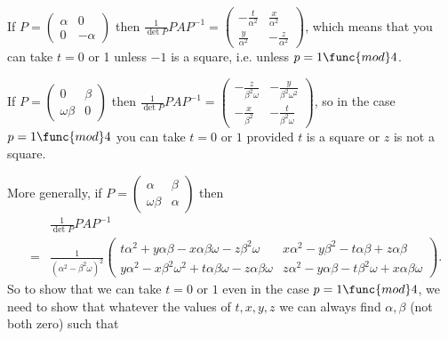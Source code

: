 \documentclass[12pt]{article}
\begin{document}
If $P=\left( 
\begin{array}{ll}
\alpha & 0 \\ 
0 & -\alpha%
\end{array}%
\right) $ then $\frac{1}{\det P}PAP^{-1}=\allowbreak \left( 
\begin{array}{cc}
-\frac{t}{\alpha ^{2}} & \frac{x}{\alpha ^{2}} \\ 
\frac{y}{\alpha ^{2}} & -\frac{z}{\alpha ^{2}}%
\end{array}%
\right) $, which means that you can take $t=0$ or 1 unless $-1$ is a square,
i.e. unless $p=1\func{mod}4$.

If $P=\left( 
\begin{array}{ll}
0 & \beta  \\ 
\omega \beta  & 0%
\end{array}%
\right) $ then $\frac{1}{\det P}PAP^{-1}=\allowbreak \left( 
\begin{array}{cc}
-\frac{z}{\beta ^{2}\omega } & -\frac{y}{\beta ^{2}\omega ^{2}} \\ 
-\frac{x}{\beta ^{2}} & -\frac{t}{\beta ^{2}\omega }%
\end{array}%
\right) $, so in the case $p=1\func{mod}4$ you can take $t=0$ or $1$
provided $t$ is a square or $z$ is not a square.

More generally, if $P=\left( 
\begin{array}{ll}
\alpha  & \beta  \\ 
\omega \beta  & \alpha 
\end{array}%
\right) $ then 
\begin{eqnarray*}
&&\frac{1}{\det P}PAP^{-1} \\
&=&\frac{1}{\left( \alpha ^{2}-\beta ^{2}\omega \right) ^{2}}\left( 
\begin{array}{cc}
t\alpha ^{2}+y\alpha \beta -x\alpha \beta \omega -z\beta ^{2}\omega  & 
x\alpha ^{2}-y\beta ^{2}-t\alpha \beta +z\alpha \beta  \\ 
y\alpha ^{2}-x\beta ^{2}\omega ^{2}+t\alpha \beta \omega -z\alpha \beta
\omega  & z\alpha ^{2}-y\alpha \beta -t\beta ^{2}\omega +x\alpha \beta
\omega 
\end{array}%
\right) .
\end{eqnarray*}%
$\allowbreak $So to show that we can take $t=0$ or $1$ even in the case $p=1%
\func{mod}4$, we need to show that whatever the values of $t,x,y,z$ we can
always find $\alpha ,\beta $ (not both zero) such that
\end{document}
